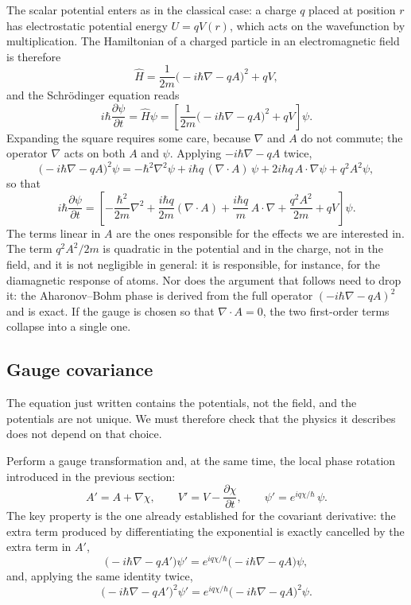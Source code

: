 The scalar potential enters as in the classical case: a charge
\(q\) placed at position \(r\) has electrostatic potential
energy \(U = qV(r)\), which acts on the wavefunction by
multiplication. The Hamiltonian of a charged particle in an
electromagnetic field is therefore
\[
	\hat H = \frac{1}{2m} \bigl(-i\hbar\nabla - qA\bigr)^{2} + qV,
\]
and the Schrödinger equation reads
\[
	i \hbar \frac{\partial \psi}{\partial t} = \hat H \psi =
	\left[\frac{1}{2m} \bigl(-i \hbar \nabla -
		qA\bigr)^2 + qV \right] \psi.
\]
Expanding the square requires some care, because \(\nabla\)
and \(A\) do not commute; the operator \(\nabla\) acts on
both \(A\) and \(\psi\). Applying \(-i \hbar \nabla -qA\)
twice,
\[
	\bigl(-i\hbar\nabla - qA\bigr)^{2}\psi
	= -\hbar^{2}\nabla^{2}\psi
	+ i\hbar q\,(\nabla\cdot A)\,\psi
	+ 2i\hbar q\,A\cdot\nabla\psi
	+ q^{2}A^{2}\psi ,
\]
so that
\[
	i\hbar\frac{\partial\psi}{\partial t}
	= \left[-\frac{\hbar^{2}}{2m}\nabla^{2}
		+ \frac{i\hbar q}{2m}(\nabla\cdot A)
		+ \frac{i\hbar q}{m}\,A\cdot\nabla
		+ \frac{q^{2}A^{2}}{2m}
		+ qV\right]\psi .
\]
The terms linear in \(A\) are the ones responsible for the effects
we are interested in. The term \(q^2A^2/2m\) is quadratic in the potential
and in the charge, not in the field, and it is not negligible in general:
it is responsible, for instance, for the diamagnetic response of atoms.
Nor does the argument that follows need to drop it: the Aharonov--Bohm phase
is derived from the full operator \((-i\hbar\nabla - qA)^2\) and is exact.
If the gauge
is chosen so that \(\nabla \cdot A = 0\), the two first-order
terms collapse into a single one.

\subsection{Gauge covariance}

The equation just written contains the potentials, not the
field, and the potentials are not unique. We must therefore
check that the physics it describes does not depend on that choice.


Perform a gauge transformation and, at the same time, the local phase rotation
introduced in the previous section:
\[
	A' = A + \nabla\chi, \qquad
	V' = V - \frac{\partial\chi}{\partial t}, \qquad
	\psi' = e^{iq\chi/\hbar}\,\psi .
\]
The key property is the one already established for the covariant derivative: the
extra term produced by differentiating the exponential is exactly cancelled by the
extra term in $A'$,
\[
	\bigl(-i\hbar\nabla - qA'\bigr)\psi' = e^{iq\chi/\hbar}\bigl(-i\hbar\nabla - qA\bigr)\psi ,
\]
and, applying the same identity twice,
\[
	\bigl(-i\hbar\nabla - qA'\bigr)^{2}\psi' = e^{iq\chi/\hbar}\bigl(-i\hbar\nabla - qA\bigr)^{2}\psi .
\]

